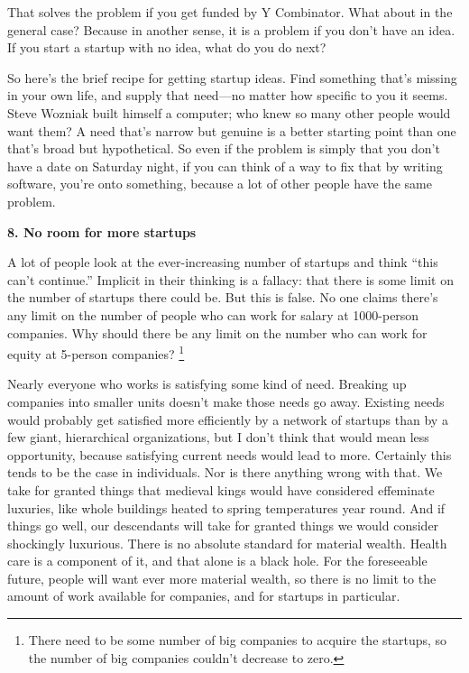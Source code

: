 That solves the problem if you get funded by Y Combinator. What about in
the general case? Because in another sense, it is a problem if you don't
have an idea. If you start a startup with no idea, what do you do next?

So here's the brief recipe for getting startup ideas. Find something
that's missing in your own life, and supply that need---no matter how
specific to you it seems. Steve Wozniak built himself a computer; who
knew so many other people would want them? A need that's narrow but
genuine is a better starting point than one that's broad but
hypothetical. So even if the problem is simply that you don't have a
date on Saturday night, if you can think of a way to fix that by writing
software, you're onto something, because a lot of other people have the
same problem.

\textbf{8. No room for more startups}

A lot of people look at the ever-increasing number of startups and think
``this can't continue.'' Implicit in their thinking is a fallacy: that
there is some limit on the number of startups there could be. But this
is false. No one claims there's any limit on the number of people who
can work for salary at 1000-person companies. Why should there be any
limit on the number who can work for equity at 5-person companies?
\footnote{There need to be some number of big companies to acquire the
startups, so the number of big companies couldn't decrease to zero.}

Nearly everyone who works is satisfying some kind of need. Breaking up
companies into smaller units doesn't make those needs go away. Existing
needs would probably get satisfied more efficiently by a network of
startups than by a few giant, hierarchical organizations, but I don't
think that would mean less opportunity, because satisfying current needs
would lead to more. Certainly this tends to be the case in individuals.
Nor is there anything wrong with that. We take for granted things that
medieval kings would have considered effeminate luxuries, like whole
buildings heated to spring temperatures year round. And if things go
well, our descendants will take for granted things we would consider
shockingly luxurious. There is no absolute standard for material wealth.
Health care is a component of it, and that alone is a black hole. For
the foreseeable future, people will want ever more material wealth, so
there is no limit to the amount of work available for companies, and for
startups in particular.

